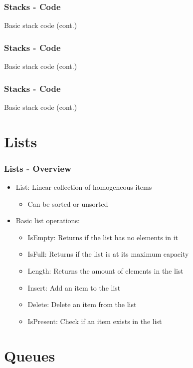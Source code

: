 \documentclass[c, aspectratio=169]{beamer}
\begin{document}
\begin{frame}\frametitle{Stacks - Code}
Basic stack code (cont.)

\end{frame}

\begin{frame}\frametitle{Stacks - Code}
Basic stack code (cont.)

\end{frame}

\begin{frame}\frametitle{Stacks - Code}
Basic stack code (cont.)

\end{frame}

\section{Lists}
\begin{frame}\frametitle{Lists - Overview}
\begin{itemize}
\item List: Linear collection of homogeneous items
	\begin{itemize}
	\item Can be sorted or unsorted
	\end{itemize}
\item Basic list operations:
	\begin{itemize}
	\item IsEmpty: Returns if the list has no elements in it
	\item IsFull: Returns if the list is at its maximum capacity
	\item Length: Returns the amount of elements in the list
	\item Insert: Add an item to the list
	\item Delete: Delete an item from the list
	\item IsPresent: Check if an item exists in the list
	\end{itemize}
\end{itemize}
\end{frame}

\begin{frame}\end{frame}
\begin{frame}\end{frame}

\section{Queues}
\begin{frame}\end{frame}
\begin{frame}\end{frame}
\begin{frame}\end{frame}
\end{document}
